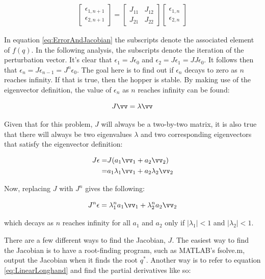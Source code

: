 \begin{align}
\begin{bmatrix}
\epsilon_{1,n+1} \\
\epsilon_{2,n+1}
\end{bmatrix}
=
\begin{bmatrix}
J_{11} &  J_{12} \\
J_{21} &  J_{22} 
\end{bmatrix}
\begin{bmatrix}
\epsilon_{1,n} \\
\epsilon_{2,n}
\end{bmatrix}
\label{eq:ErrorAndJacobian}
\end{align}

In equation \ref{eq:ErrorAndJacobian} the subscripts denote the associated element of $f(q)$. In the following analysis, the subscripts denote the iteration of the perturbation vector. It's clear that $\epsilon_{1}=J\epsilon_{0}$ and $\epsilon_{2}=J\epsilon_{1}=JJ\epsilon_{0}$. It follows then that $\epsilon_{n}=J\epsilon_{n-1}=J^{n}\epsilon_{0}$. The goal here is to find out if $\epsilon_{n}$ decays to zero as $n$ reaches infinity. If that is true, then the hopper is stable. By making use of the eigenvector definition, the value of $\epsilon_{n}$ as $n$ reaches infinity can be found:

\begin{equation*}
J\vv=\lambda\vv 
\end{equation*}

Given that for this problem, $J$ will always be a two-by-two matrix, it is also true that there will always be two eigenvalues $\lambda$ and two corresponding eigenvectors that satisfy the eigenvector definition:

\begin{align*}
J\epsilon=&J(a_{1}\vv_{1}+a_{2}\vv_{2}) \\
=&a_{1}\lambda_{1}\vv_{1}+a_{2}\lambda_{2}\vv_{2}
\end{align*}

Now, replacing $J$ with $J^{n}$ gives the following:

\begin{equation*}
J^{n}\epsilon=\lambda_{1}^{n}a_{1}\vv_{1}+\lambda_{2}^{n}a_{2}\vv_{2}
\end{equation*}

which decays as $n$ reaches infinity for all $a_{1}$ and $a_{2}$ only if $|\lambda_{1}| < 1$ and $|\lambda_{2}| < 1$.

There are a few different ways to find the Jacobian, $J$. The easiest way to find the Jacobian is to have a root-finding program, such as MATLAB's fsolve.m, output the Jacobian when it finds the root $q^*$. Another way is to refer to equation \ref{eq:LinearLonghand} and find the partial derivatives like so:

